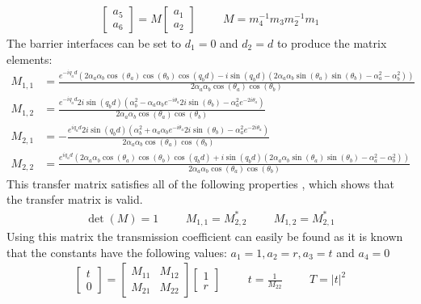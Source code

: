 			\begin{align}
				\left[\begin{array}{ccc}
					a_{5}\\
					a_{6}
				\end{array}\right]=M
				\left[\begin{array}{ccc}
					a_{1}\\
					a_{2}
				\end{array}\right]\hspace{1cm}
				M=m_{4}^{-1}m_{3}m_{2}^{-1}m_{1}
			\end{align}
			The barrier interfaces can be set to $d_{1}=0$ and $d_{2}=d$ to produce the matrix elements:
				\begin{align}
					M_{1,1}&=\frac{e^{-iq_{a}d}\left(2\alpha_{a}\alpha_{b}\cos(\theta_{a})\cos(\theta_{b})\cos(q_{b}d)-i\sin(q_{b}d)\left(2\alpha_{a}\alpha_{b}\sin(\theta_{a})\sin(\theta_{b})-\alpha_{a}^{2}-\alpha_{b}^{2}\right)\right)}{2\alpha_{a}\alpha_{b}\cos(\theta_{a})\cos(\theta_{b})}\\
					M_{1,2}&=\frac{e^{-iq_{a}d}2i\sin(q_{b}d)\left(\alpha_{b}^{2}-\alpha_{a}\alpha_{b}e^{-i\theta_{a}}2i\sin(\theta_{b})-\alpha_{a}^{2}e^{-2i\theta_{a}}\right)}{2\alpha_{a}\alpha_{b}\cos(\theta_{a})\cos(\theta_{b})}\\
					M_{2,1}&=-\frac{e^{iq_{a}d}2i\sin(q_{b}d)\left(\alpha_{b}^{2}+\alpha_{a}\alpha_{b}e^{-i\theta_{a}}2i\sin(\theta_{b})-\alpha_{a}^{2}e^{-2i\theta_{a}}\right)}{2\alpha_{a}\alpha_{b}\cos(\theta_{a})\cos(\theta_{b})}\\
M_{2,2}&=\frac{e^{iq_{a}d}\left(2\alpha_{a}\alpha_{b}\cos(\theta_{a})\cos(\theta_{b})\cos(q_{b}d)+i\sin(q_{b}d)\left(2\alpha_{a}\alpha_{b}\sin(\theta_{a})\sin(\theta_{b})-\alpha_{a}^{2}-\alpha_{b}^{2}\right)\right)}{2\alpha_{a}\alpha_{b}\cos(\theta_{a})\cos(\theta_{b})}
				\end{align}
				This transfer matrix satisfies all of the following properties \cite{b18}, which shows that the transfer matrix is valid.
				\begin{align}
					\det(M)=1\hspace{1cm}M_{1,1}=M_{2,2}^{*}\hspace{1cm}M_{1,2}=M_{2,1}^{*}
				\end{align}
				Using this matrix the transmission coefficient can easily be found as it is known that the constants have the following values: $a_{1}=1, a_{2}=r, a_{3}=t$ and $a_{4}=0$
				\begin{align}
					\left[\begin{array}{ccc}
						t\\
						0
					\end{array}\right]=
					\left[\begin{array}{ccc}
						M_{11}&M_{12}\\
						M_{21}&M_{22}
					\end{array}\right]
					\left[\begin{array}{ccc}
						1\\
						r
					\end{array}\right]\hspace{1cm}
					t=\frac{1}{M_{22}}\hspace{1cm}T=|t|^{2}
				\end{align}
